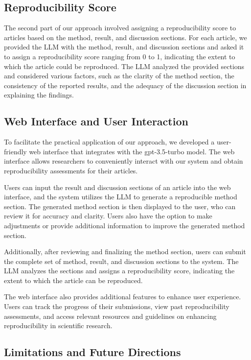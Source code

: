 \documentclass[12pt, a4paper, twocolumn]{article}
\begin{document}
		\subsection{Reproducibility Score}
		
		The second part of our approach involved assigning a reproducibility score to articles based on the method, result, and discussion sections. For each article, we provided the LLM with the method, result, and discussion sections and asked it to assign a reproducibility score ranging from 0 to 1, indicating the extent to which the article could be reproduced. The LLM analyzed the provided sections and considered various factors, such as the clarity of the method section, the consistency of the reported results, and the adequacy of the discussion section in explaining the findings.
		
		\subsection{Web Interface and User Interaction}
		
		To facilitate the practical application of our approach, we developed a user-friendly web interface that integrates with the gpt-3.5-turbo model. The web interface allows researchers to conveniently interact with our system and obtain reproducibility assessments for their articles.
		
		Users can input the result and discussion sections of an article into the web interface, and the system utilizes the LLM to generate a reproducible method section. The generated method section is then displayed to the user, who can review it for accuracy and clarity. Users also have the option to make adjustments or provide additional information to improve the generated method section.
		
		Additionally, after reviewing and finalizing the method section, users can submit the complete set of method, result, and discussion sections to the system. The LLM analyzes the sections and assigns a reproducibility score, indicating the extent to which the article can be reproduced.
		
		The web interface also provides additional features to enhance user experience. Users can track the progress of their submissions, view past reproducibility assessments, and access relevant resources and guidelines on enhancing reproducibility in scientific research.
		
		\subsection{Limitations and Future Directions}
		
\end{document}
